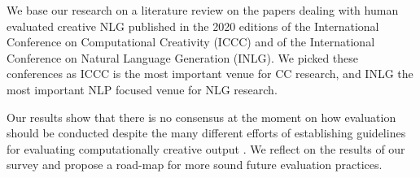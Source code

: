 \documentclass[11pt,a4paper]{article}
\begin{document}
We base our research on a literature review on the papers dealing with human evaluated creative NLG published in the 2020 editions of the International Conference on Computational Creativity (ICCC) and of the International Conference on Natural Language Generation (INLG). We picked these conferences as ICCC is the most important venue for CC research, and INLG the most important NLP focused venue for NLG research.

Our results show that there is no consensus at the moment on how evaluation should be conducted despite the many different efforts of establishing guidelines for evaluating computationally creative output \cite{pease2011impact,jordanous2012standardised,lamb2018evaluating,hamalainen2020generating}. We reflect on the results of our survey and propose a road-map for more sound future evaluation practices.
\end{document}
